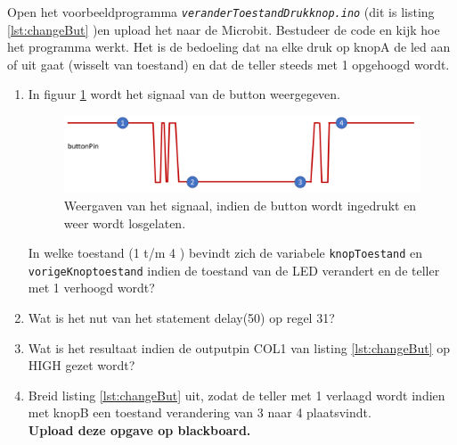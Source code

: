 Open het voorbeeldprogramma \texttt{\textit{veranderToestandDrukknop.ino}} (dit is listing \ref{lst:changeBut} )en upload het naar de Microbit.
Bestudeer de code en kijk hoe het programma werkt. Het is de bedoeling dat na elke druk op knopA de led aan of uit gaat (wisselt van toestand) en dat de teller steeds met 1 opgehoogd wordt. 
	\begin{enumerate}[label=(\Alph*)]

	\item In figuur \ref{fig:swToestand} wordt het signaal van de button weergegeven.
\begin{figure}[h!]
	\captionsetup{justification=centering}
	\includegraphics[width=0.8 \linewidth]{figuren/toestandButtonPin}
	\centering
	\caption{Weergaven van het signaal, indien de button wordt ingedrukt en weer wordt losgelaten.}
	\label{fig:swToestand}
\end{figure}
In welke toestand (1 t/m 4 )  bevindt zich de variabele \texttt{knopToestand} en \texttt{vorigeKnoptoestand} indien de toestand van de LED verandert en de teller met 1 verhoogd wordt?
\item Wat is het nut van het statement \textcolor{arduinoOrange}{delay}(50) op regel 31?\hrulefill
\item Wat is het resultaat indien de outputpin COL1 van listing \ref{lst:changeBut} op \textcolor{arduinoBlue}{HIGH} gezet wordt?	
\item Breid listing \ref{lst:changeBut} uit, zodat de teller met 1 verlaagd wordt indien met knopB een toestand verandering van 3 naar 4 plaatsvindt.\\
\textbf{Upload deze opgave op blackboard.}
	
\end{enumerate}

